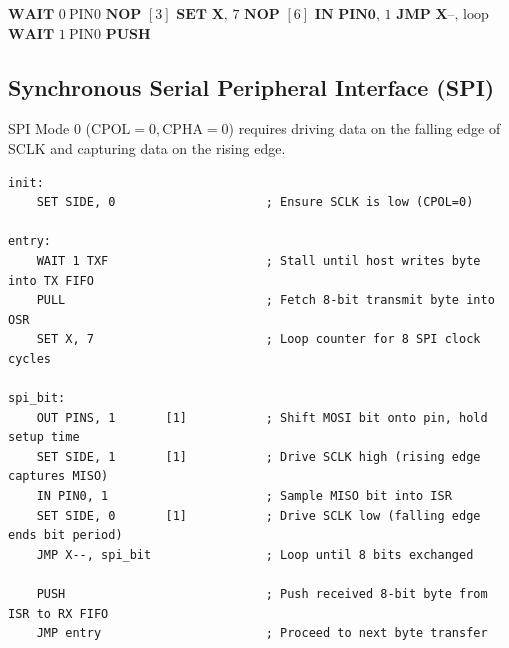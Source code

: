 \documentclass[11pt,a4paper]{article}
\begin{document}
\begin{algorithm}[H]
\caption{UART Receiver with Half-Bit Center Sampling}
\begin{algorithmic}[1]
\LOOP
    \STATE $\textbf{WAIT } 0\ \text{PIN0}$ 
    \STATE $\textbf{NOP } [3]$ 
    \STATE $\textbf{SET X, } 7$ 
    \REPEAT
        \STATE $\textbf{NOP } [6]$ 
        \STATE $\textbf{IN PIN0, } 1$ 
        \STATE $\textbf{JMP X--, } \text{loop}$
    \STATE $\textbf{WAIT } 1\ \text{PIN0}$ 
    \STATE $\textbf{PUSH}$ 
\ENDLOOP
\end{algorithmic}
\end{algorithm}

\subsection{Synchronous Serial Peripheral Interface (SPI)}
SPI Mode 0 ($\text{CPOL}=0, \text{CPHA}=0$) requires driving data on the falling edge of SCLK and capturing data on the rising edge.

\begin{lstlisting}[language={[x86masm]Assembler}, caption={Full-Duplex SPI Master Microcode (Mode 0)}]
init:
    SET SIDE, 0                     ; Ensure SCLK is low (CPOL=0)

entry:
    WAIT 1 TXF                      ; Stall until host writes byte into TX FIFO
    PULL                            ; Fetch 8-bit transmit byte into OSR
    SET X, 7                        ; Loop counter for 8 SPI clock cycles

spi_bit:
    OUT PINS, 1       [1]           ; Shift MOSI bit onto pin, hold setup time
    SET SIDE, 1       [1]           ; Drive SCLK high (rising edge captures MISO)
    IN PIN0, 1                      ; Sample MISO bit into ISR
    SET SIDE, 0       [1]           ; Drive SCLK low (falling edge ends bit period)
    JMP X--, spi_bit                ; Loop until 8 bits exchanged

    PUSH                            ; Push received 8-bit byte from ISR to RX FIFO
    JMP entry                       ; Proceed to next byte transfer
\end{lstlisting}
\end{document}
